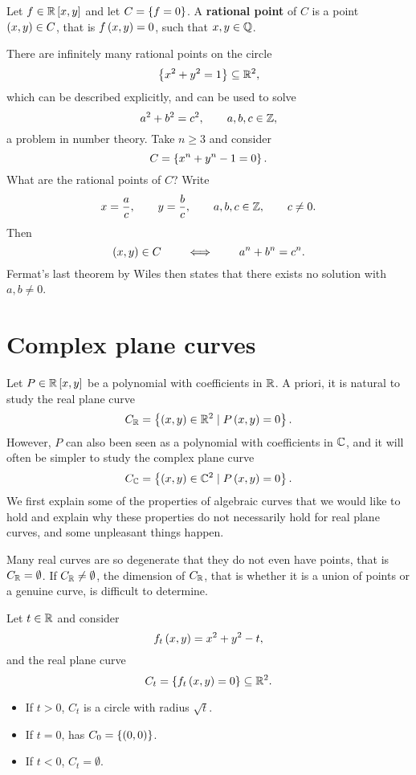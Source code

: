 
\begin{definition}
Let $ f \in \mathbb{R}\left[ x, y \right] $ and let $ C = \left\{ f = 0 \right\} $. A \textbf{rational point} of $ C $ is a point $ \left( x, y \right) \in C $, that is $ f\left( x, y \right) = 0 $, such that $ x, y \in \mathbb{Q} $.
\end{definition}

\begin{example}
There are infinitely many rational points on the circle
$$ \left\{ x^2 + y^2 = 1 \right\} \subseteq \mathbb{R}^2, $$
which can be described explicitly, and can be used to solve
$$ a^2 + b^2 = c^2, \qquad a, b, c \in \mathbb{Z}, $$
a problem in number theory. Take $ n \ge 3 $ and consider
$$ C = \left\{ x^n + y^n - 1 = 0 \right\}. $$
What are the rational points of $ C $? Write
$$ x = \dfrac{a}{c}, \qquad y = \dfrac{b}{c}, \qquad a, b, c \in \mathbb{Z}, \qquad c \ne 0. $$
Then
$$ \left( x, y \right) \in C \qquad \iff \qquad a^n + b^n = c^n. $$
Fermat's last theorem by Wiles then states that there exists no solution with $ a, b \ne 0 $.
\end{example}

\pagebreak

\section{Complex plane curves}

Let $ P \in \mathbb{R}\left[ x, y \right] $ be a polynomial with coefficients in $ \mathbb{R} $. A priori, it is natural to study the real plane curve
$$ C_{\mathbb{R}} = \left\{ \left( x, y \right) \in \mathbb{R}^2 \mid P\left( x, y \right) = 0 \right\}. $$
However, $ P $ can also been seen as a polynomial with coefficients in $ \mathbb{C} $, and it will often be simpler to study the complex plane curve
$$ C_{\mathbb{C}} = \left\{ \left( x, y \right) \in \mathbb{C}^2 \mid P\left( x, y \right) = 0 \right\}. $$
We first explain some of the properties of algebraic curves that we would like to hold and explain why these properties do not necessarily hold for real plane curves, and some unpleasant things happen.

\begin{fact*}
Many real curves are so degenerate that they do not even have points, that is $ C_{\mathbb{R}} = \emptyset $. If $ C_{\mathbb{R}} \ne \emptyset $, the dimension of $ C_{\mathbb{R}} $, that is whether it is a union of points or a genuine curve, is difficult to determine.
\end{fact*}

\begin{example}
\label{eg:2.1}
Let $ t \in \mathbb{R} $ and consider
$$ f_t\left( x, y \right) = x^2 + y^2 - t, $$
and the real plane curve
$$ C_t = \left\{ f_t\left( x, y \right) = 0 \right\} \subseteq \mathbb{R}^2. $$
\begin{itemize}
\item If $ t > 0 $, $ C_t $ is a circle with radius $ \sqrt{t} $.
\item If $ t = 0 $, has $ C_0 = \left\{ \left( 0, 0 \right) \right\} $.
\item If $ t < 0 $, $ C_t = \emptyset $.
\end{itemize}

\end{example}

